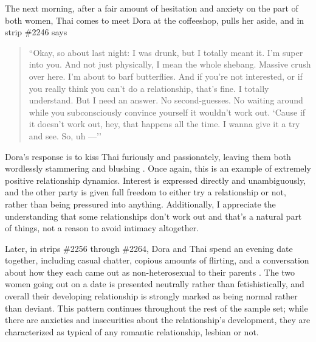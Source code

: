\documentclass[man,12pt]{apa6}
\begin{document}
The next morning, after a fair amount of hesitation and anxiety on the part of both women, Thai comes to meet Dora at the coffeeshop, pulls her aside, and in strip \#2246 says
\begin{quote}
``Okay, so about last night: I was drunk, but I totally meant it. I'm super into you. And not just physically, I mean the whole shebang. Massive crush over here. I'm about to barf butterflies. And if you're not interested, or if you really think you can't do a relationship, that's fine. I totally understand. But I need an answer. No second-guesses. No waiting around while you subconsciously convince yourself it wouldn't work out. `Cause if it doesn't work out, hey, that happens all the time. I wanna give it a try and see. So, uh  ---''
\end{quote}
Dora's response is to kiss Thai furiously and passionately, leaving them both wordlessly stammering and blushing \cite{qc}. Once again, this is an example of extremely positive relationship dynamics. Interest is expressed directly and unambiguously, and the other party is given full freedom to either try a relationship or not, rather than being pressured into anything. Additionally, I appreciate the understanding that some relationships don't work out and that's a natural part of things, not a reason to avoid intimacy altogether. 

Later, in strips \#2256 through \#2264, Dora and Thai spend an evening date together, including casual chatter, copious amounts of flirting, and a conversation about how they each came out as non-heterosexual to their parents \cite{qc}. The two women going out on a date is presented neutrally rather than fetishistically, and overall their developing relationship is strongly marked as being normal rather than deviant. This pattern continues throughout the rest of the sample set; while there are anxieties and insecurities about the relationship's development, they are characterized as typical of any romantic relationship, lesbian or not. 
\end{document}
